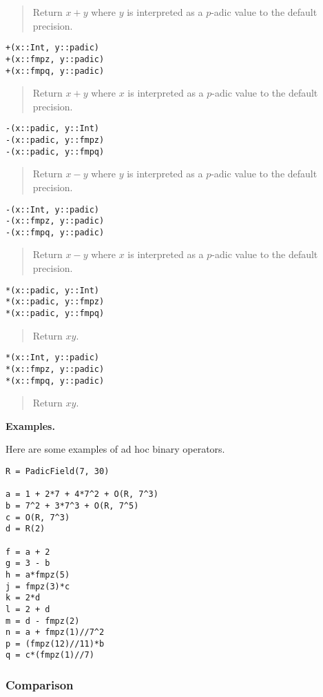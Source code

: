 \documentclass[a4paper,10pt]{article}
\newcommand{\desc}[1]{\vspace{-3mm}\begin{quote}#1\end{quote}}
\begin{document}
{{\desc{Return $x + y$ where $y$ is interpreted as a $p$-adic value to the default
precision.}

\begin{lstlisting}
+(x::Int, y::padic)
+(x::fmpz, y::padic)
+(x::fmpq, y::padic)
\end{lstlisting}

\desc{Return $x + y$ where $x$ is interpreted as a $p$-adic value to the default
precision.}

\begin{lstlisting}
-(x::padic, y::Int)
-(x::padic, y::fmpz)
-(x::padic, y::fmpq)
\end{lstlisting}

\desc{Return $x - y$ where $y$ is interpreted as a $p$-adic value to the default
precision.}

\begin{lstlisting}
-(x::Int, y::padic)
-(x::fmpz, y::padic)
-(x::fmpq, y::padic)
\end{lstlisting}

\desc{Return $x - y$ where $x$ is interpreted as a $p$-adic value to the default
precision.}

\begin{lstlisting}
*(x::padic, y::Int)
*(x::padic, y::fmpz)
*(x::padic, y::fmpq)
\end{lstlisting}

\desc{Return $xy$.}

\begin{lstlisting}
*(x::Int, y::padic)
*(x::fmpz, y::padic)
*(x::fmpq, y::padic)
\end{lstlisting}

\desc{Return $xy$.}

\textbf{Examples.}

Here are some examples of ad hoc binary operators.

\begin{lstlisting}
R = PadicField(7, 30)

a = 1 + 2*7 + 4*7^2 + O(R, 7^3)
b = 7^2 + 3*7^3 + O(R, 7^5)
c = O(R, 7^3)
d = R(2)

f = a + 2
g = 3 - b
h = a*fmpz(5)
j = fmpz(3)*c
k = 2*d
l = 2 + d
m = d - fmpz(2)
n = a + fmpz(1)//7^2
p = (fmpz(12)//11)*b
q = c*(fmpz(1)//7)
\end{lstlisting}

\subsubsection{Comparison}

}}
\end{document}
